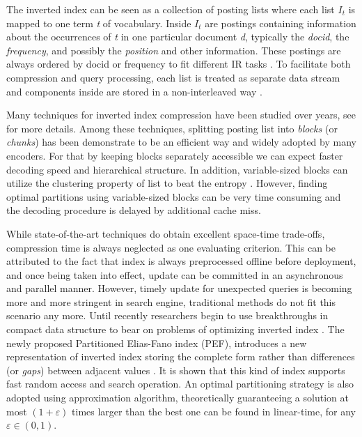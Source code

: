 \documentclass[runningheads,a4paper]{llncs}
\begin{document}
The inverted index can be seen as a collection of posting lists where each list $I_t$ is mapped to one term \textit{t} of vocabulary.
Inside $I_t$ are postings containing information about the occurrences of \textit{t} in one particular document \textit{d}, typically the \textit{docid}, the \textit{frequency}, and possibly the \textit{position} and other information.
These postings are always ordered by docid or frequency to fit different IR tasks \cite{navarro2010dual}.
To facilitate both compression and query processing, each list is treated as separate data stream and components inside are stored in a non-interleaved way \cite{anh2010index}.

Many techniques for inverted index compression have been studied over years, see \cite{catena2014inverted,trotman2014compression} for more details.
Among these techniques, splitting posting list into \textit{blocks} (or \textit{chunks}) has been demonstrate to be an efficient way and widely adopted by many encoders.
For that by keeping blocks separately accessible we can expect faster decoding speed and hierarchical structure.
In addition, variable-sized blocks can utilize the clustering property of list to beat the entropy \cite{silvestri2010vsencoding,moffat2000binary}.
However, finding optimal partitions using variable-sized blocks can be very time consuming and the decoding procedure is delayed by additional cache miss.

While state-of-the-art techniques do obtain excellent space-time trade-offs, compression time is always neglected as one evaluating criterion.
This can be attributed to the fact that index is always preprocessed offline before deployment, and once being taken into effect, update can be committed in an asynchronous and parallel manner.
However, timely update for unexpected queries is becoming more and more stringent in search engine, traditional methods do not fit this scenario any more.
Until recently researchers begin to use breakthroughs in compact data structure to bear on problems of optimizing inverted index \cite{navarro2010dual,petri2014score}.
The newly proposed Partitioned Elias-Fano index (PEF), introduces a new representation of inverted index storing the complete form rather than differences (or \textit{gaps}) between adjacent values \cite{ottaviano2014partitioned,vigna2013quasi}.
It is shown that this kind of index supports fast random access and search operation.
An optimal partitioning strategy is also adopted using approximation algorithm, theoretically guaranteeing a solution at most $\left(1+\varepsilon\right)$ times larger than the best one can be found in linear-time, for any $ \varepsilon \in \left(0,1\right) $.
\end{document}
